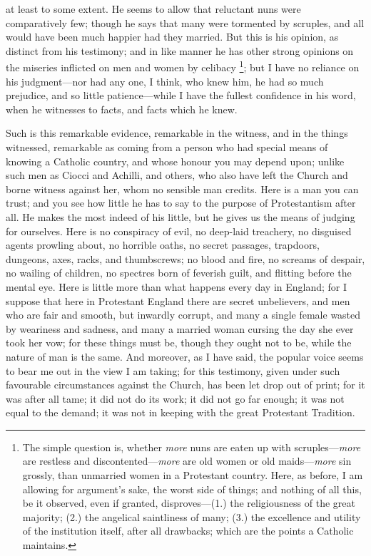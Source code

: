 at least to some extent. He seems to allow that reluctant
nuns were comparatively few; though he says that many
were tormented by scruples, and all would have been much
happier had they married. But this is his opinion, as
distinct from his testimony; and in like manner he has
other strong opinions on the miseries inflicted on men
and women by celibacy \footnote{The simple question is,
whether \emph{more} nuns are eaten up with
scruples—\emph{more} are restless and
discontented—\emph{more} are old women or old
maids—\emph{more} sin grossly, than unmarried
women in a Protestant country. Here, as before, I am
allowing for argument's sake, the worst side of things;
and nothing of all this, be it observed, even if granted,
disproves—(1.) the religiousness of the great
majority; (2.) the angelical saintliness of many; (3.)
the excellence and utility of the institution itself,
after all drawbacks; which are the points a Catholic
maintains.}; but I have no reliance on
his judgment—nor had any one, I think, who knew him,
he had so much prejudice, and so little
patience—while I have the fullest confidence in his
word, when he witnesses to facts, and facts which he
knew.

Such is this remarkable evidence, remarkable in the
witness, and in the things witnessed, remarkable as
coming from a person who had special means of knowing a
Catholic country, and whose honour you may depend upon;
unlike such men as Ciocci and Achilli, and others, who
also have left the Church and borne witness against her,
whom no sensible man credits. Here is a man you can
trust; and you see how little he has to say to the
purpose of Protestantism after all. He makes the most
indeed of his little, but he gives us the means of
judging for ourselves. Here is no conspiracy of evil, no
deep-laid treachery, no disguised agents prowling about,
no horrible oaths, no secret passages, trapdoors,
dungeons, axes, racks, and thumbscrews; no blood and
fire, no screams of despair, no wailing of children, no
spectres born of feverish guilt, and flitting before the
mental eye. Here is little more than what happens every
day in England; for I suppose that here in Protestant
England there are secret unbelievers, and men who are
fair and smooth, but inwardly corrupt, and many a single
female wasted by weariness and sadness, and many a
married woman cursing the day she ever took her vow; for
these things must be, though they ought not to be, while
the nature of man is the same. And moreover, as I have
said, the popular voice seems to bear me out in the view
I am taking; for this testimony, given under such
favourable circumstances against the Church, has been let
drop out of print; for it was after all tame; it did not
do its work; it did not go far enough; it was not equal
to the demand; it was not in keeping with the great
Protestant Tradition.

